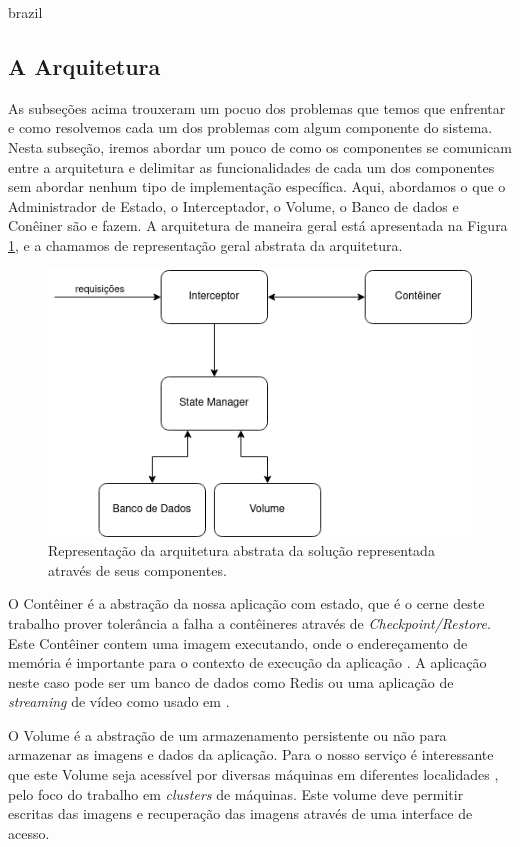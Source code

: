 \begin{otherlanguage*}{brazil}
\subsection{A Arquitetura}

As subseções acima trouxeram um pocuo dos problemas que temos que enfrentar e como
resolvemos cada um dos problemas com algum componente do sistema. Nesta subseção, iremos
abordar um pouco de como os componentes se comunicam entre a arquitetura e delimitar as
funcionalidades de cada um dos componentes sem abordar nenhum tipo de implementação
específica. Aqui, abordamos o que o Administrador de Estado, o Interceptador, o Volume, o
Banco de dados e Conêiner são e fazem. A arquitetura de maneira geral está apresentada na Figura
\ref{fig:abstract-architecture}, e a chamamos de representação geral abstrata da arquitetura.

\begin{figure}[h]
\centering
\includegraphics[scale=0.54]{images/abstract-architecture.png}
\caption{Representação da arquitetura abstrata da solução representada através de seus componentes.}
\label{fig:abstract-architecture}
\end{figure}

O Contêiner é a abstração da nossa aplicação com estado, que é o cerne deste trabalho
prover tolerância a falha a contêineres através de \textit{Checkpoint/Restore}. Este Contêiner
contem uma imagem executando, onde o endereçamento de memória é importante para o contexto
de execução da aplicação \cite{Chen2015/10}. A aplicação neste caso pode ser um banco
de dados como Redis ou uma aplicação de \textit{streaming} de vídeo como usado em \cite{vayghan2021kubernetes}.

O Volume é a abstração de um armazenamento persistente ou não para armazenar as imagens e
dados da aplicação. Para o nosso serviço é interessante que este Volume seja acessível
por diversas máquinas em diferentes localidades \cite{vayghan2021kubernetes}, pelo foco
do trabalho em \textit{clusters} de máquinas. Este volume deve permitir escritas das imagens
e recuperação das imagens através de uma interface de acesso.


\end{otherlanguage*}
